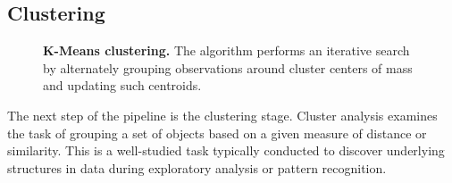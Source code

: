 \subsection{Clustering} \label{sec:clustering}

    


\begin{figure}
    \centering
     \caption{\textbf{K-Means clustering.} The algorithm performs an iterative search by alternately grouping observations around cluster centers of mass and updating such centroids.}
    \label{fig:kmeans-pipeline}
\end{figure}

    

The next step of the pipeline is the clustering stage.
Cluster analysis examines the task of grouping a set of objects based on a given measure of distance or similarity.
This is a well-studied task typically conducted to discover underlying structures in data during exploratory analysis or pattern recognition.

